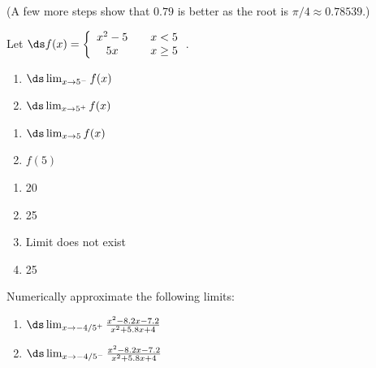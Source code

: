 \begin{enumialphparenastyle}
\begin{ex}
\begin{sol}
\begin{enumerate}
{(A few more steps show that $0.79$ is better as the root is $\pi/4 \approx 0.78539$.)
}
\end{enumerate}
\end{sol}

\end{ex}

\begin{ex}
{Let $\ds f(x)= \left\{\begin{array}{ccc}
x^2-5 & & x<5 \\
5x & & x \geq 5
\end{array}\right.$.

\noindent\begin{minipage}[t]{.5\linewidth}
\begin{enumerate}
\item		$\ds \lim_{x\to 5^-} f(x)$
\item		$\ds \lim_{x\to 5^+} f(x)$
\end{enumerate}
\end{minipage}
\noindent\begin{minipage}[t]{.5\linewidth}
\begin{enumerate}\addtocounter{enumii}{2}
\item		$\ds \lim_{x\to 5} f(x)$
\item		$f(5)$\end{enumerate}
\end{minipage}		
}


\begin{sol}
{\begin{enumerate}
\item		20
\item		25
\item		Limit does not exist
\item		25
\end{enumerate}
}

\end{sol}
\end{ex}

\begin{ex}

{Numerically approximate the following limits:
\begin{enumerate}
\item	$\ds \lim_{x\to -4/5^+} \frac{x^2-8.2 x-7.2}{x^2+5.8 x+4}$
\item	$\ds \lim_{x\to -4/5^-} \frac{x^2-8.2 x-7.2}{x^2+5.8 x+4}$
\end{enumerate}
}
\begin{sol}



\end{sol}
\end{ex}
\end{enumialphparenastyle}
